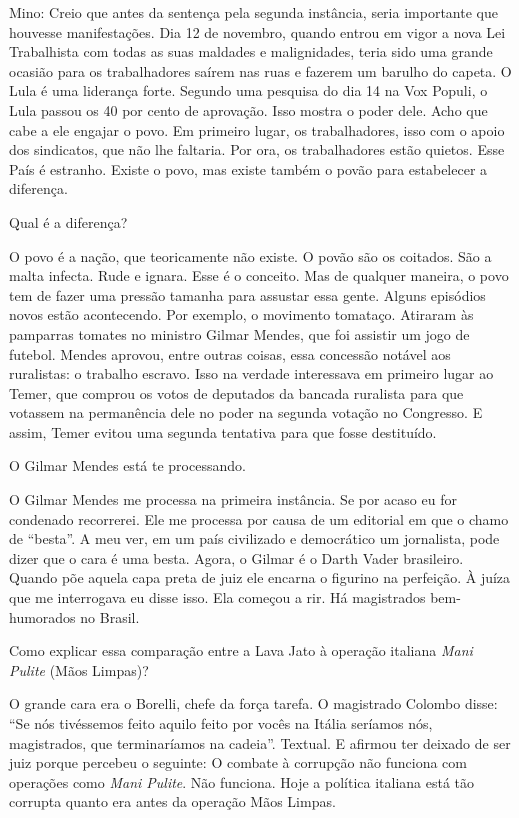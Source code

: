 Mino: Creio que antes da sentença pela segunda instância, seria
importante que houvesse manifestações. Dia 12 de novembro, quando entrou
em vigor a nova Lei Trabalhista com todas as suas maldades e
malignidades, teria sido uma grande ocasião para os trabalhadores saírem
nas ruas e fazerem um barulho do capeta. O Lula é uma liderança forte.
Segundo uma pesquisa do dia 14 na Vox Populi, o Lula passou os 40 por
cento de aprovação. Isso mostra o poder dele. Acho que cabe a ele
engajar o povo. Em primeiro lugar, os trabalhadores, isso com o apoio
dos sindicatos, que não lhe faltaria. Por ora, os trabalhadores estão
quietos. Esse País é estranho. Existe o povo, mas existe também o povão
para estabelecer a diferença.

 Qual é a diferença?

 O povo é a nação, que teoricamente não existe. O povão são os
coitados. São a malta infecta. Rude e ignara. Esse é o conceito. Mas de
qualquer maneira, o povo tem de fazer uma pressão tamanha para assustar
essa gente. Alguns episódios novos estão acontecendo. Por exemplo, o
movimento tomataço. Atiraram às pamparras tomates no ministro Gilmar
Mendes, que foi assistir um jogo de futebol. Mendes aprovou, entre
outras coisas, essa concessão notável aos ruralistas: o trabalho
escravo. Isso na verdade interessava em primeiro lugar ao Temer, que
comprou os votos de deputados da bancada ruralista para que votassem na
permanência dele no poder na segunda votação no Congresso. E assim,
Temer evitou uma segunda tentativa para que fosse destituído.

 O Gilmar Mendes está te processando.

 O Gilmar Mendes me processa na primeira instância. Se por acaso eu
for condenado recorrerei. Ele me processa por causa de um editorial em
que o chamo de ``besta''. A meu ver, em um país civilizado e democrático
um jornalista, pode dizer que o cara é uma besta. Agora, o Gilmar é o
Darth Vader brasileiro. Quando põe aquela capa preta de juiz ele encarna
o figurino na perfeição. À juíza que me interrogava eu disse isso. Ela
começou a rir. Há magistrados bem-humorados no Brasil.

 Como explicar essa comparação entre a Lava Jato à operação italiana
\emph{Mani Pulite} (Mãos Limpas)?

 O grande cara era o Borelli, chefe da força tarefa. O magistrado
Colombo disse: ``Se nós tivéssemos feito aquilo feito por vocês na
Itália seríamos nós, magistrados, que terminaríamos na cadeia''.
Textual. E afirmou ter deixado de ser juiz porque percebeu o seguinte: O
combate à corrupção não funciona com operações como \emph{Mani Pulite}.
Não funciona. Hoje a política italiana está tão corrupta quanto era
antes da operação Mãos Limpas.

